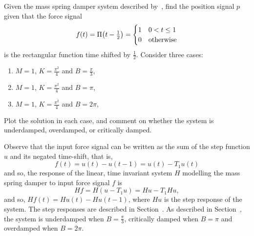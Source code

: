 \begin{excersizelist}
\begin{hardexercise}
\item \label{exer:massspringdamperrect} Given the mass spring damper system described by~, find the position signal $p$ given that the force signal 
\[
f(t) = \Pi\big(t-\tfrac{1}{2}\big) = \begin{cases}
1 & 0 < t \leq 1 \\
0 & \text{otherwise}
\end{cases}
\]
is the rectangular function time shifted by $\tfrac{1}{2}$.  Consider three cases:
\begin{enumerate}
\item $M=1$, $K=\tfrac{\pi^2}{4}$ and $B=\tfrac{\pi}{3}$,
\item $M=1$, $K=\tfrac{\pi^2}{4}$ and $B=\pi$,
\item $M=1$, $K=\tfrac{\pi^2}{4}$ and $B=2\pi$,
\end{enumerate}
Plot the solution in each case, and comment on whether the system is underdamped, overdamped, or critically damped. 
\begin{solution}
Observe that the input force signal can be written as the sum of the step function $u$ and its negated time-shift, that is,
\[
f(t) = u(t) - u(t - 1) = u(t) - T_{1} u(t)
\]
and so, the response of the linear, time invariant system $H$ modelling the mass spring damper to input force signal $f$ is
\[
Hf = H(u - T_{1}u) = Hu - T_{1}Hu,
\]
and so, $Hf(t) = Hu(t) - Hu(t-1)$, where $Hu$ is the step response of the system.  The step responses are described in Section~.  As described in Section~, the system is underdamped when $B = \tfrac{\pi}{3}$, critically damped when $B = \pi$ and overdamped when $B = 2\pi$.
\end{solution}
\end{hardexercise}


\end{excersizelist}
